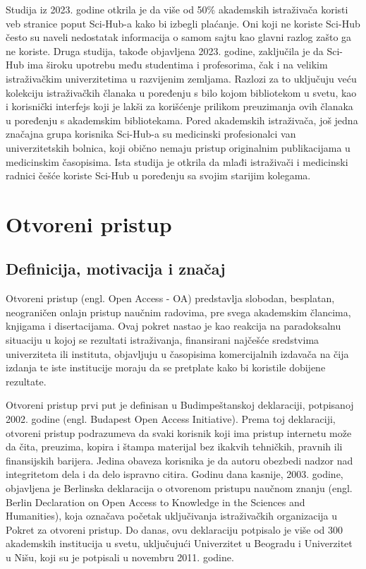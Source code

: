\documentclass{article}
\begin{document}
Studija iz 2023. godine otkrila je da više od 50\% akademskih istraživača koristi veb stranice poput Sci-Hub-a kako bi izbegli plaćanje. Oni koji ne koriste Sci-Hub često su naveli nedostatak informacija o samom sajtu kao glavni razlog zašto ga ne koriste. Druga studija, takođe objavljena 2023. godine, zaključila je da Sci-Hub ima široku upotrebu među studentima i profesorima, čak i na velikim istraživačkim univerzitetima u razvijenim zemljama. Razlozi za to uključuju veću kolekciju istraživačkih članaka u poređenju s bilo kojom bibliotekom u svetu, kao i korisnički interfejs koji je lakši za korišćenje prilikom preuzimanja ovih članaka u poređenju s akademskim bibliotekama. Pored akademskih istraživača, još jedna značajna grupa korisnika Sci-Hub-a su medicinski profesionalci van univerzitetskih bolnica, koji obično nemaju pristup originalnim publikacijama u medicinskim časopisima. Ista studija je otkrila da mlađi istraživači i medicinski radnici češće koriste Sci-Hub u poređenju sa svojim starijim kolegama.


\section{Otvoreni pristup}

\subsection{Definicija, motivacija i značaj}

Otvoreni pristup (engl. Open Access - OA) predstavlja slobodan, besplatan, neograničen onlajn pristup naučnim radovima, pre svega akademskim člancima, knjigama i disertacijama. Ovaj pokret nastao je kao reakcija na paradoksalnu situaciju u kojoj se rezultati istraživanja, finansirani najčešće sredstvima univerziteta ili instituta, objavljuju u časopisima komercijalnih izdavača na čija izdanja te iste institucije moraju da se pretplate kako bi koristile dobijene rezultate.

Otvoreni pristup prvi put je definisan u Budimpeštanskoj deklaraciji, potpisanoj 2002. godine (engl. Budapest Open Access Initiative). Prema toj deklaraciji, otvoreni pristup podrazumeva da svaki korisnik koji ima pristup internetu može da čita, preuzima, kopira i štampa materijal bez ikakvih tehničkih, pravnih ili finansijskih barijera. Jedina obaveza korisnika je da autoru obezbedi nadzor nad integritetom dela i da delo ispravno citira. Godinu dana kasnije, 2003. godine, objavljena je Berlinska deklaracija o otvorenom pristupu naučnom znanju (engl. Berlin Declaration on Open Access to Knowledge in the Sciences and Humanities), koja označava početak uključivanja istraživačkih organizacija u Pokret za otvoreni pristup. Do danas, ovu deklaraciju potpisalo je više od 300 akademskih institucija u svetu, uključujući Univerzitet u Beogradu i Univerzitet u Nišu, koji su je potpisali u novembru 2011. godine.
\end{document}
